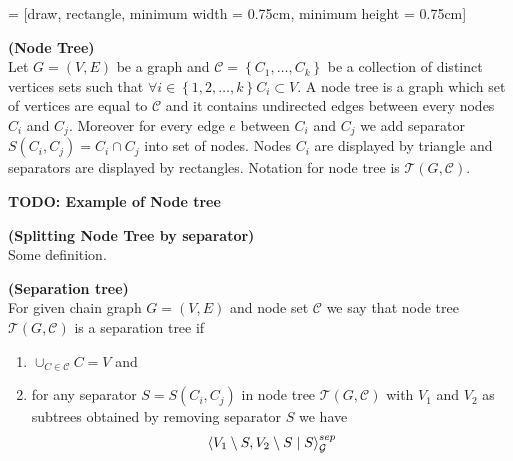 %
%


 = [draw, rectangle, minimum width = 0.75cm, minimum height = 0.75cm]



\begin{defi} {\textbf{(Node Tree)}} \\ 
	Let $G = (V, E)$ be a graph and $\mathcal{C} = \left\{ C_1, \dots, C_k\right\}$ be a collection of distinct 
	vertices sets such that $\forall i \in \left\{1, 2, \dots, k \right\} C_i \subset V$. 
	A node tree is a graph which set of vertices are equal to $\mathcal{C}$ and it contains undirected edges between
	every nodes $C_i$ and $C_j$. Moreover for every edge $e$ between $C_i$ and $C_j$ we add separator 
	$S(C_i, C_j) = C_i \cap C_j$ into set of nodes. Nodes $C_i$ are displayed by triangle and separators are
	displayed by rectangles. Notation for node tree is $\mathcal{T}(G, \mathcal{C})$.
\end{defi}


\textbf{TODO: Example of Node tree}

\begin{defi} {\textbf{(Splitting Node Tree by separator)}} \\ 
	Some definition.
\end{defi}


\begin{defi} {\textbf{(Separation tree)}} \\
	For given chain graph $G = (V, E)$ and node set $\mathcal{C}$ we say that node tree $\mathcal{T}(G, \mathcal{C})$
	is a separation tree if 

	\begin{enumerate}
		\item $\cup_{C \in \mathcal{C}} C = V$ and
		\item for any separator $S = S(C_i, C_j)$ in node tree $\mathcal{T}(G, \mathcal{C})$ with $V_1$ 
		and $V_2$ as subtrees obtained by removing separator $S$ we have  
		$$ \left\langle V_1 \setminus S , V_2 \setminus S \mid S \right\rangle_{\mathcal{G}}^{sep} $$
	\end{enumerate}		
	
\end{defi}


